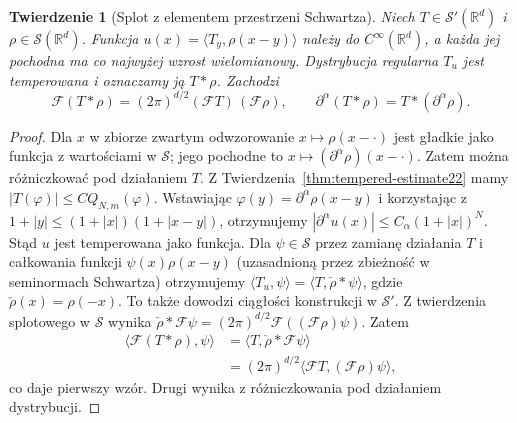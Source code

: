 \documentclass[11pt,a4paper]{article}
\numberwithin{equation}{section}
\theoremstyle{plain}
\newtheorem{twierdzenie}{Twierdzenie}[section]
\theoremstyle{definition}
\theoremstyle{remark}
\newcommand{\R}{\mathbb R}
\begin{document}
\begin{twierdzenie}[Splot z elementem przestrzeni Schwartza]
\label{thm:schwartz-convolution22}
Niech $T\in\mathcal S'(\R^d)$ i
$\rho\in\mathcal S(\R^d)$. Funkcja
$u(x)=\langle T_y,\rho(x-y)\rangle$ należy do
$C^\infty(\R^d)$, a każda jej pochodna ma
co najwyżej wzrost wielomianowy. Dystrybucja
regularna $T_u$ jest temperowana i oznaczamy ją $T*\rho$.
Zachodzi
\[
\mathcal F(T*\rho)=(2\pi)^{d/2}(\mathcal FT)\,(\mathcal F\rho),
\qquad \partial^\alpha(T*\rho)=T*(\partial^\alpha\rho).
\]
\end{twierdzenie}
\begin{proof}
Dla $x$ w zbiorze zwartym odwzorowanie
$x\mapsto\rho(x-\cdot)$ jest gładkie jako funkcja
z wartościami w $\mathcal S$; jego pochodne to
$x\mapsto(\partial^\alpha\rho)(x-\cdot)$.
Zatem można różniczkować pod działaniem $T$.
Z Twierdzenia~\ref{thm:tempered-estimate22} mamy
$|T(\varphi)|\le C Q_{N,m}(\varphi)$.
Wstawiając $\varphi(y)=\partial^\alpha\rho(x-y)$
i korzystając z
$1+|y|\le(1+|x|)(1+|x-y|)$,
otrzymujemy
$|\partial^\alpha u(x)|\le C_\alpha(1+|x|)^N$.
Stąd $u$ jest temperowana jako funkcja.
Dla $\psi\in\mathcal S$ przez zamianę działania $T$
i całkowania funkcji $\psi(x)\rho(x-y)$
(uzasadnioną przez zbieżność w seminormach Schwartza)
otrzymujemy
$\langle T_u,\psi\rangle=
\langle T,\check\rho*\psi\rangle$,
gdzie $\check\rho(x)=\rho(-x)$.
To także dowodzi ciągłości konstrukcji w $\mathcal S'$.
Z twierdzenia splotowego w $\mathcal S$ wynika
$\check\rho*\mathcal F\psi
=(2\pi)^{d/2}\mathcal F((\mathcal F\rho)\psi)$.
Zatem
\[
\begin{aligned}
\langle\mathcal F(T*\rho),\psi\rangle
&=\langle T,\check\rho*\mathcal F\psi\rangle\\
&=(2\pi)^{d/2}\langle\mathcal FT,
 (\mathcal F\rho)\psi\rangle,
\end{aligned}
\]
co daje pierwszy wzór. Drugi wynika z różniczkowania
pod działaniem dystrybucji.
\end{proof}
\end{document}
